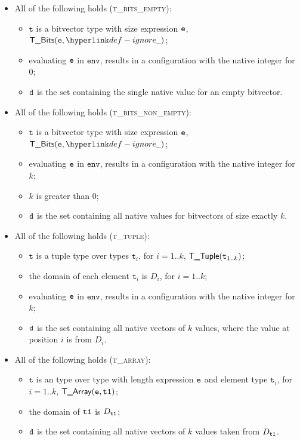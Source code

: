 \documentclass{book}
\newcommand\env[0]{\texttt{env}}
\newcommand\vt[0]{\texttt{t}}
\begin{document}
\begin{itemize}
  \item All of the following holds (\textsc{t\_bits\_empty}):
  \begin{itemize}
    \item $\vt$ is a bitvector type with size expression $\texttt{e}$, $\TBits(\ve, \Ignore)$;
    \item evaluating $\texttt{e}$ in $\env$, results in a configuration with the native integer for $0$;
    \item $\texttt{d}$ is the set containing the single native value for an empty bitvector.
  \end{itemize}

  \item All of the following holds (\textsc{t\_bits\_non\_empty}):
  \begin{itemize}
    \item $\vt$ is a bitvector type with size expression $\texttt{e}$, $\TBits(\ve, \Ignore)$;
    \item evaluating $\texttt{e}$ in $\env$, results in a configuration with the native integer for $k$;
    \item $k$ is greater than $0$;
    \item $\texttt{d}$ is the set containing all native values for bitvectors of size exactly $k$.
  \end{itemize}

  \item All of the following holds (\textsc{t\_tuple}):
  \begin{itemize}
    \item $\vt$ is a tuple type over types $\vt_i$, for $i=1..k$, $\TTuple(\vt_{1..k})$;
    \item the domain of each element $\vt_i$ is $D_i$, for $i=1..k$;
    \item evaluating $\texttt{e}$ in $\env$, results in a configuration with the native integer for $k$;
    \item $\texttt{d}$ is the set containing all native vectors of $k$ values, where the value at position $i$
    is from $D_i$.
  \end{itemize}

  \item All of the following holds (\textsc{t\_array}):
  \begin{itemize}
    \item $\vt$ is an type over type with length expression $\texttt{e}$ and element type $\vt_i$, for $i=1..k$, $\textsf{T\_Array}(\texttt{e}, \texttt{t1})$;
    \item the domain of $\texttt{t1}$ is $D_{\texttt{t1}}$;
    \item $\texttt{d}$ is the set containing all native vectors of $k$ values taken from $D_{\texttt{t1}}$.
  \end{itemize}


\end{itemize}
\end{document}
